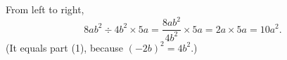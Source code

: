 From left to right,
\[
8ab^2\div4b^2\times5a=\dfrac{8ab^2}{4b^2}\times5a=2a\times5a=\boxed{10a^2}.
\]
(It equals part (1), because $(-2b)^2=4b^2$.)
